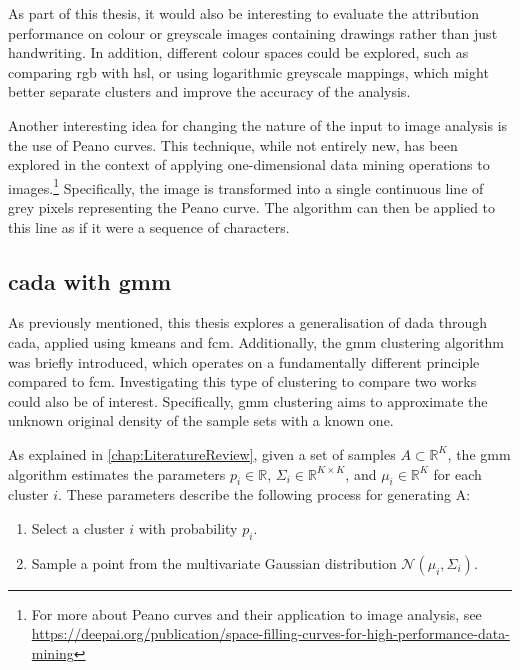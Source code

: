 \begin{toReview}
\noindent As part of this thesis, it would also be interesting to evaluate the attribution performance on colour or greyscale images containing drawings rather than just handwriting. In addition, different colour spaces could be explored, such as comparing \gls{rgb} with \gls{hsl}, or using logarithmic greyscale mappings, which might better separate clusters and improve the accuracy of the analysis.

\noindent Another interesting idea for changing the nature of the input to image analysis is the use of Peano curves. This technique, while not entirely new, has been explored in the context of applying one-dimensional data mining operations to images.\footnote{For more about Peano curves and their application to image analysis, see \\ \url{https://deepai.org/publication/space-filling-curves-for-high-performance-data-mining}} Specifically, the image is transformed into a single continuous line of grey pixels representing the Peano curve. The algorithm can then be applied to this line as if it were a sequence of characters.

\subsection{\gls{cada} with \gls{gmm}}
As previously mentioned, this thesis explores a generalisation of \gls{dada} through \gls{cada}, applied using \gls{kmeans} and \gls{fcm}. Additionally, the \gls{gmm} clustering algorithm was briefly introduced, which operates on a fundamentally different principle compared to \gls{fcm}. Investigating this type of clustering to compare two works could also be of interest. Specifically, \gls{gmm} clustering aims to approximate the unknown original density of the sample sets with a known one.

\noindent As explained in \cref{chap:LiteratureReview}, given a set of samples $A\subset\mathbb{R}^K$, the \gls{gmm} algorithm estimates the parameters $p_i\in \mathbb{R}$, $\Sigma_i\in\mathbb{R}^{K\times K}$, and $\mu_i\in\mathbb{R}^K$ for each cluster $i$. These parameters describe the following process for generating A:
\begin{enumerate}
	\item Select a cluster $i$ with probability $p_i$.
	\item Sample a point from the multivariate Gaussian distribution $\mathcal{N}\left(\mu_i,\Sigma_i\right)$.
\end{enumerate}


\end{toReview}
